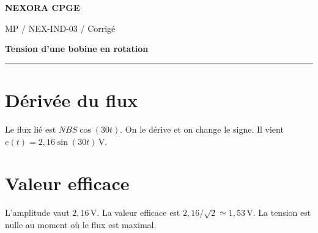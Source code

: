 \documentclass[11pt,a4paper]{article}
\begin{document}
{\small\bfseries\color{nexorablue} NEXORA CPGE}\par
{\small MP / NEX-IND-03 / Corrigé}\par
{\LARGE\bfseries Tension d’une bobine en rotation}\par
\vspace{0.25em}\hrule\vspace{0.6em}

\section*{Dérivée du flux}
Le flux lié est $NBS\cos(30t)$. On le dérive et on change le signe. Il vient $e(t)=2{,}16\sin(30t)\,\mathrm V$.

\section*{Valeur efficace}
L’amplitude vaut $2{,}16\,\mathrm V$. La valeur efficace est $2{,}16/\sqrt2\simeq1{,}53\,\mathrm V$. La tension est nulle au moment où le flux est maximal.
\end{document}
